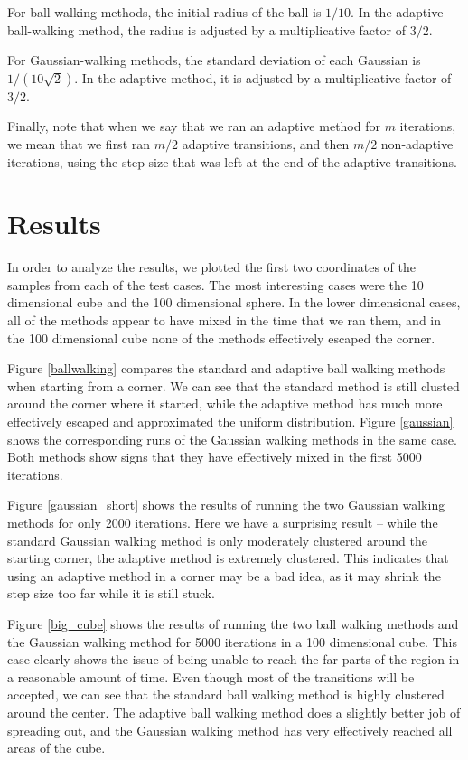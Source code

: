 \documentclass[11pt]{article}
\begin{document}
For ball-walking methods, the initial radius of the ball is $1/10$. In the adaptive ball-walking method, the radius is adjusted by a multiplicative factor of $3/2$.

For Gaussian-walking methods, the standard deviation of each Gaussian is $1/(10\sqrt{2})$. In the adaptive method, it is adjusted by a multiplicative factor of $3/2$.

Finally, note that when we say that we ran an adaptive method for $m$ iterations, we mean that we first ran $m/2$ adaptive transitions, and then $m/2$ non-adaptive iterations, using the step-size that was left at the end of the adaptive transitions.

\section{Results}

In order to analyze the results, we plotted the first two coordinates of the samples from each of the test cases. The most interesting cases were the 10 dimensional cube and the 100 dimensional sphere. In the lower dimensional cases, all of the methods appear to have mixed in the time that we ran them, and in the 100 dimensional cube none of the methods effectively escaped the corner.

Figure \ref{ballwalking} compares the standard and adaptive ball walking methods when starting from a corner. We can see that the standard method is still clusted around the corner where it started, while the adaptive method has much more effectively escaped and approximated the uniform distribution.
Figure \ref{gaussian} shows the corresponding runs of the Gaussian walking methods in the same case. Both methods show signs that they have effectively mixed in the first 5000 iterations.

Figure \ref{gaussian_short} shows the results of running the two Gaussian walking methods for only 2000 iterations. Here we have a surprising result -- while the standard Gaussian walking method is only moderately clustered around the starting corner, the adaptive method is extremely clustered. This indicates that using an adaptive method in a corner may be a bad idea, as it may shrink the step size too far while it is still stuck.

Figure \ref{big_cube} shows the results of running the two ball walking methods and the Gaussian walking method for 5000 iterations in a 100 dimensional cube. This case clearly shows the issue of being unable to reach the far parts of the region in a reasonable amount of time. Even though most of the transitions will be accepted, we can see that the standard ball walking method is highly clustered around the center. The adaptive ball walking method does a slightly better job of spreading out, and the Gaussian walking method has very effectively reached all areas of the cube.
\end{document}
